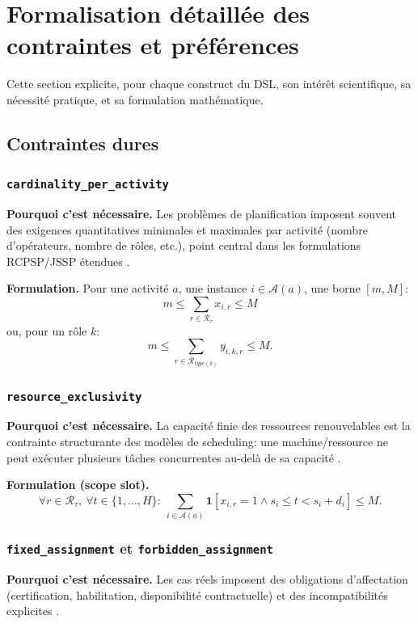 \documentclass[12pt,a4paper]{article}
\begin{document}
\section{Formalisation détaillée des contraintes et préférences}
Cette section explicite, pour chaque construct du DSL, son intérêt scientifique, sa nécessité pratique, et sa formulation mathématique.

\subsection{Contraintes dures}
\subsubsection{\texttt{cardinality\_per\_activity}}
\textbf{Pourquoi c'est nécessaire.}
Les problèmes de planification imposent souvent des exigences quantitatives minimales et maximales par activité (nombre d'opérateurs, nombre de rôles, etc.), point central dans les formulations RCPSP/JSSP étendues \cite{abdolrazzagh2017jssp,torba2024msrcmpsp}.

\textbf{Formulation.}
Pour une activité \(a\), une instance \(i\in\mathcal{A}(a)\), une borne \([m,M]\):
\[
m \le \sum_{r\in\mathcal{R}_\tau} x_{i,r} \le M
\]
ou, pour un rôle \(k\):
\[
m \le \sum_{r\in\mathcal{R}_{type(k)}} y_{i,k,r} \le M.
\]

\subsubsection{\texttt{resource\_exclusivity}}
\textbf{Pourquoi c'est nécessaire.}
La capacité finie des ressources renouvelables est la contrainte structurante des modèles de scheduling: une machine/ressource ne peut exécuter plusieurs tâches concurrentes au-delà de sa capacité \cite{marriott1998cp,abdolrazzagh2017jssp}.

\textbf{Formulation (scope slot).}
\[
\forall r\in\mathcal{R}_\tau,\ \forall t\in\{1,\dots,H\}:\ 
\sum_{i\in\mathcal{A}(a)} \mathbf{1}[x_{i,r}=1\land s_i\le t<s_i+d_i] \le M.
\]

\subsubsection{\texttt{fixed\_assignment} et \texttt{forbidden\_assignment}}
\textbf{Pourquoi c'est nécessaire.}
Les cas réels imposent des obligations d'affectation (certification, habilitation, disponibilité contractuelle) et des incompatibilités explicites \cite{torba2024msrcmpsp,snauwaert2025hskills}.
\end{document}
